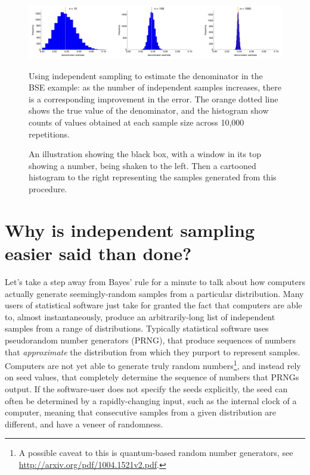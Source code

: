\documentclass[11pt,fullpage]{book}
\begin{document}
\begin{figure}
\centering
\scalebox{0.25} 
{\includegraphics{MCMC_BSEindependentSampling.pdf}}
\caption{Using independent sampling to estimate the denominator in the BSE example: as the number of independent samples increases, there is a corresponding improvement in the error. The orange dotted line shows the true value of the denominator, and the histogram show counts of values obtained at each sample size across 10,000 repetitions.}\label{fig:MCMC_BSEindependentSampling}
\end{figure}


\begin{figure}
\centering
\scalebox{0.25} 
\caption{An illustration showing the black box, with a window in its top showing a number, being shaken to the left. Then a cartooned histogram to the right representing the samples generated from this procedure.}\label{fig:MCMC_blackBox}
\end{figure}

\section{Why is independent sampling easier said than done?}\label{sec:MCMC_independentSamplingDifficult}
Let's take a step away from Bayes' rule for a minute to talk about how computers actually generate seemingly-random samples from a particular distribution. Many users of statistical software just take for granted the fact that computers are able to, almost instantaneously, produce an arbitrarily-long list of independent samples from a range of distributions. Typically statistical software uses pseudorandom number generators (PRNG), that produce sequences of numbers that \textit{approximate} the distribution from which they purport to represent samples. Computers are not yet able to generate truly random numbers\footnote{A possible caveat to this is quantum-based random number generators, see \url{http://arxiv.org/pdf/1004.1521v2.pdf}.}, and instead rely on seed values, that completely determine the sequence of numbers that PRNGs output. If the software-user does not specify the seeds explicitly, the seed can often be determined by a rapidly-changing input, such as the internal clock of a computer, meaning that consecutive samples from a given distribution are different, and have a veneer of randomness. 
\end{document}
